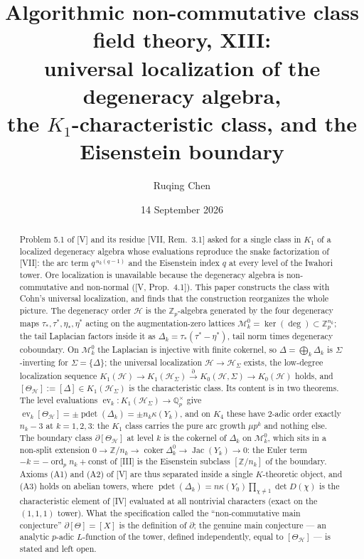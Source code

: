 \documentclass[11pt]{amsart}
\title[Algorithmic non-commutative class field theory, XIII]
{Algorithmic non-commutative class field theory, XIII:\\
universal localization of the degeneracy algebra,\\ the $K_1$-characteristic class, and the
Eisenstein boundary}
\author{Ruqing Chen}
\date{14 September 2026}
\numberwithin{equation}{section}
\theoremstyle{definition}
\theoremstyle{remark}
\newcommand{\Z}{\mathbb{Z}}
\newcommand{\Q}{\mathbb{Q}}
\newcommand{\Zp}{\Z_p}
\newcommand{\Qp}{\Q_p}
\newcommand{\cH}{\mathcal{H}}
\newcommand{\cM}{\mathcal{M}}
\newcommand{\Jac}{\operatorname{Jac}}
\newcommand{\coker}{\operatorname{coker}}
\newcommand{\ord}{\operatorname{ord}}
\newcommand{\pdet}{\operatorname{pdet}}
\newcommand{\ev}{\operatorname{ev}}
\newcommand{\ta}{\tau_*}
\newcommand{\taup}{\tau^*}
\newcommand{\et}{\eta_*}
\newcommand{\etp}{\eta^*}
\newcommand{\HS}{\cH_\Sigma}
\begin{document}
\begin{abstract}
Problem 5.1 of [V] and its residue [VII, Rem.~3.1] asked for a single class in $K_1$ of a
localized degeneracy algebra whose evaluations reproduce the snake factorization of [VII]:
the arc term $q^{\,n_k(q-1)}$ and the Eisenstein index $q$ at every level of the Iwahori tower.
Ore localization is unavailable because the degeneracy algebra is non-commutative and
non-normal ([V, Prop.~4.1]). This paper constructs the class with Cohn's universal
localization, and finds that the construction reorganizes the whole picture. The degeneracy
order $\cH$ is the $\Zp$-algebra generated by the four degeneracy maps $\ta,\taup,\et,\etp$
acting on the augmentation-zero lattices $\cM^{0}_k=\ker(\deg)\subset\Zp^{n_k}$; the tail
Laplacian factors inside it as $\Delta_k=\ta(\taup-\etp)$, tail norm times degeneracy
coboundary. On $\cM^{0}_k$ the Laplacian is injective with finite cokernel, so
$\Delta=\bigoplus_k\Delta_k$ is $\Sigma$-inverting for $\Sigma=\{\Delta\}$; the universal
localization $\cH\to\HS$ exists, the low-degree localization sequence
$K_1(\cH)\to K_1(\HS)\xrightarrow{\partial}K_0(\cH,\Sigma)\to K_0(\cH)$ holds, and
$[\Theta_{\cH}]:=[\Delta]\in K_1(\HS)$ is the characteristic class. Its content is in two
theorems. The level evaluations $\ev_k\colon K_1(\HS)\to\Qp^{\times}$ give
$\ev_k[\Theta_{\cH}]=\pm\pdet(\Delta_k)=\pm n_k\kappa(Y_k)$, and on $K_4$ these have
$2$-adic order exactly $n_k-3$ at $k=1,2,3$: the $K_1$ class carries the pure arc growth
$\mu p^{k}$ and nothing else. The boundary class $\partial[\Theta_{\cH}]$ at level $k$ is the
cokernel of $\Delta_k$ on $\cM^{0}_k$, which sits in a non-split extension
$0\to\Z/n_k\to\coker\Delta_k^{0}\to\Jac(Y_k)\to0$: the Euler term $-k=-\ord_pn_k+\mathrm{const}$
of [III] is the Eisenstein subclass $[\Z/n_k]$ of the boundary. Axioms (A1) and (A2) of [V]
are thus separated inside a single $K$-theoretic object, and (A3) holds on abelian towers,
where $\pdet(\Delta_k)=n\kappa(Y_0)\prod_{\chi\ne1}\det D(\chi)$ is the characteristic
element of [IV] evaluated at all nontrivial characters (exact on the $(1,1,1)$ tower). What
the specification called the ``non-commutative main conjecture'' $\partial[\Theta]=[X]$ is
the definition of $\partial$; the genuine main conjecture --- an analytic $p$-adic
$L$-function of the tower, defined independently, equal to $[\Theta_{\cH}]$ --- is stated and
left open.
\end{abstract}

\maketitle
\end{document}
